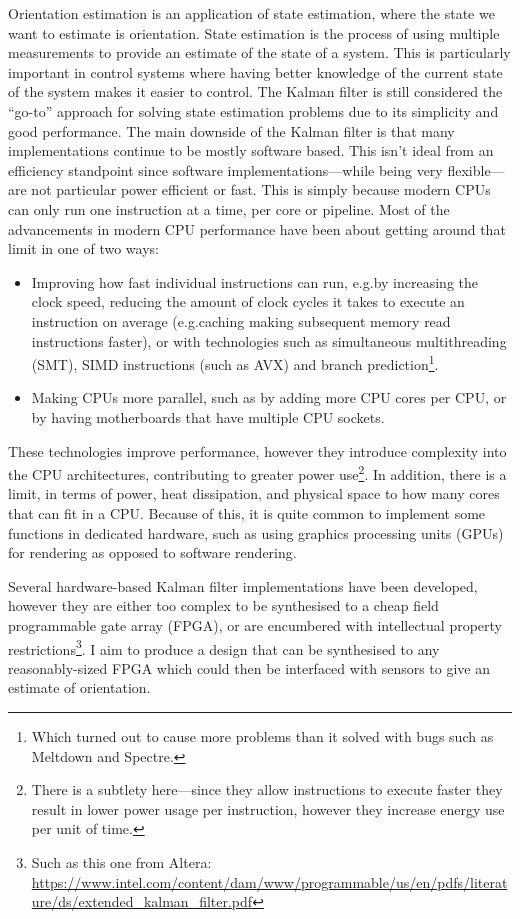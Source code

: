 \documentclass[12pt]{article}
\begin{document}
Orientation estimation is an application of state estimation, where the state we want to estimate is orientation. State estimation is the process of using multiple measurements to provide an estimate of the state of a system. This is particularly important in control systems where having better knowledge of the current state of the system makes it easier to control. The Kalman filter is still considered the ``go-to'' approach for solving state estimation problems due to its simplicity and good performance. The main downside of the Kalman filter is that many implementations continue to be mostly software based\cite{ayub_2012}. This isn't ideal from an efficiency standpoint since software implementations---while being very flexible---are not particular power efficient or fast. This is simply because modern CPUs can only run one instruction at a time, per core or pipeline. Most of the advancements in modern CPU performance have been about getting around that limit in one of two ways:
\begin{itemize}
	\item Improving how fast individual instructions can run, e.g.\@ by increasing the clock speed, reducing the amount of clock cycles it takes to execute an instruction on average (e.g.\@ caching making subsequent memory read instructions faster), or with technologies such as simultaneous multithreading (SMT), SIMD instructions (such as AVX) and branch prediction\footnote{Which turned out to cause more problems than it solved with bugs such as Meltdown and Spectre.}.
	\item Making CPUs more parallel, such as by adding more CPU cores per CPU, or by having motherboards that have multiple CPU sockets.
\end{itemize}
These technologies improve performance, however they introduce complexity into the CPU architectures, contributing to greater power use\footnote{There is a subtlety here---since they allow instructions to execute faster they result in lower power usage per instruction, however they increase energy use per unit of time.}. In addition, there is a limit, in terms of power, heat dissipation, and physical space to how many cores that can fit in a CPU. Because of this, it is quite common to implement some functions in dedicated hardware, such as using graphics processing units (GPUs) for rendering as opposed to software rendering.

Several hardware-based Kalman filter implementations have been developed, however they are either too complex \cite{mills_2016} to be synthesised to a cheap field programmable gate array (FPGA), or are encumbered with intellectual property restrictions\footnote{Such as this one from Altera: \url{https://www.intel.com/content/dam/www/programmable/us/en/pdfs/literature/ds/extended_kalman_filter.pdf}}. I aim to produce a design that can be synthesised to any reasonably-sized FPGA which could then be interfaced with sensors to give an estimate of orientation.
\end{document}
